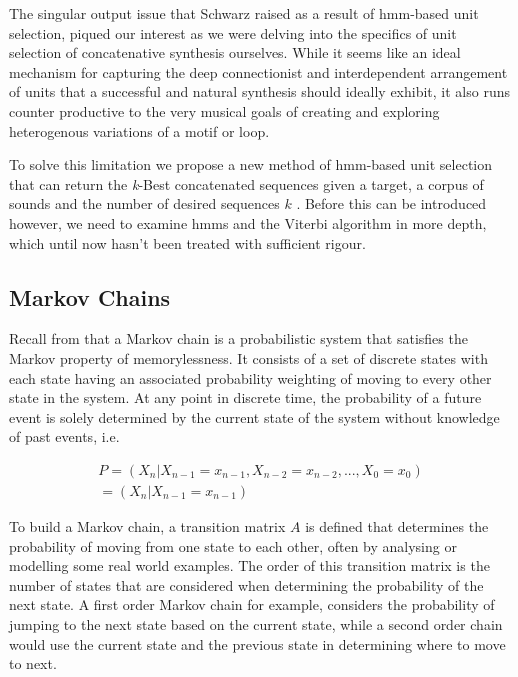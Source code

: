 {{{{{{{The singular output issue that Schwarz raised as a result of \acrshort{hmm}-based unit selection, piqued our interest as we were delving into the specifics of unit selection  of concatenative synthesis ourselves. While it seems like an ideal mechanism for capturing the deep connectionist and interdependent arrangement of units that a successful and natural synthesis should ideally exhibit, it also runs counter productive to the very musical goals of creating and exploring heterogenous variations of a motif or loop.

To solve this limitation we propose a new method of \acrshort{hmm}-based unit selection that can return the \textit{k}-Best concatenated sequences given a target, a corpus of sounds and the number of desired sequences $k$ \citep{Nuanain2017}. Before this can be introduced however, we need to examine \acrshort{hmm}s and the Viterbi algorithm in more depth, which until now hasn't been treated with sufficient rigour. 

\subsection{Markov Chains}

Recall from  that a Markov chain is a probabilistic system that satisfies the Markov property of memorylessness. It consists of a set of discrete states with each state having an associated probability weighting of moving to every other state in the system. At any point in discrete time, the probability of a future event is solely determined by the current state of the system without knowledge of past events, i.e.

\begin{equation}
  \label{eq:markov2}
  \begin{gathered}
P=(X_{n}|X_{n-1}=x_{n-1},X_{n-2}=x_{n-2},...,X_{0}=x_{0}) \\
=(X_{n}|X_{n-1}=x_{n-1})
  \end{gathered}
\end{equation}

To build a Markov chain, a transition matrix $A$ is defined that determines the probability of moving from one state to each other, often by analysing or modelling some real world examples. The order of this transition matrix is the number of states that are considered when determining the probability of the next state. A first order Markov chain for example, considers the probability of jumping to the next state based on the current state, while a second order chain would use the current state and the previous state in determining where to move to next.

}}}}}}}
